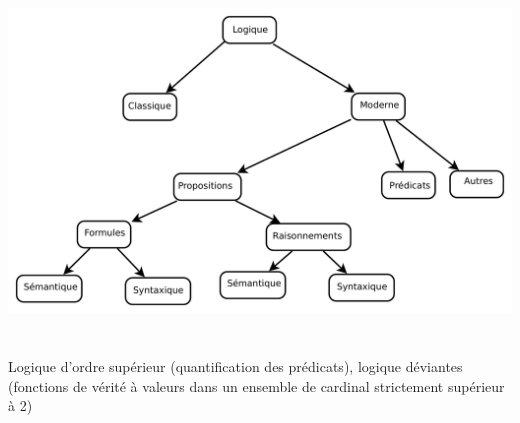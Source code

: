 \includegraphics[width=\linewidth]{fig1_types.pdf}\\

\\
\\
 Logique d'ordre supérieur (quantification des prédicats), logique déviantes (fonctions de vérité à valeurs dans un ensemble de cardinal strictement supérieur à 2)
